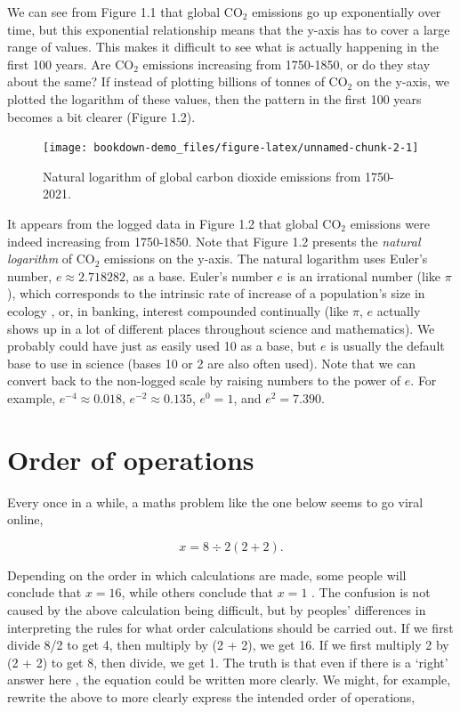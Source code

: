 \documentclass[
  openany]{krantz}
\begin{document}
We can see from Figure 1.1 that global CO\(_{2}\) emissions go up exponentially over time, but this exponential relationship means that the y-axis has to cover a large range of values.
This makes it difficult to see what is actually happening in the first 100 years.
Are CO\(_{2}\) emissions increasing from 1750-1850, or do they stay about the same?
If instead of plotting billions of tonnes of CO\(_{2}\) on the y-axis, we plotted the logarithm of these values, then the pattern in the first 100 years becomes a bit clearer (Figure 1.2).

\begin{figure}
\texttt{[image: bookdown-demo\_files/figure-latex/unnamed-chunk-2-1]} \caption{Natural logarithm of global carbon dioxide emissions from 1750-2021.}\label{fig:unnamed-chunk-2}
\end{figure}

It appears from the logged data in Figure 1.2 that global CO\(_{2}\) emissions were indeed increasing from 1750-1850.
Note that Figure 1.2 presents the \emph{natural logarithm} of CO\(_{2}\) emissions on the y-axis.
The natural logarithm uses Euler's number, \(e \approx 2.718282\), as a base.
Euler's number \(e\) is an irrational number (like \(\pi\)), which corresponds to the intrinsic rate of increase of a population's size in ecology \citep{Gotelli2001}, or, in banking, interest compounded continually (like \(\pi\), \(e\) actually shows up in a lot of different places throughout science and mathematics).
We probably could have just as easily used 10 as a base, but \(e\) is usually the default base to use in science (bases 10 or 2 are also often used).
Note that we can convert back to the non-logged scale by raising numbers to the power of \(e\).
For example, \(e^{-4} \approx 0.018\), \(e^{-2} \approx 0.135\), \(e^{0} = 1\), and \(e^{2} = 7.390\).

\hypertarget{order-of-operations}{%
\section{Order of operations}\label{order-of-operations}}

Every once in a while, a maths problem like the one below seems to go viral online,

\[x = 8 \div 2\left(2+2\right).\]

Depending on the order in which calculations are made, some people will conclude that \(x = 16\), while others conclude that \(x = 1\) \citep{Chernoff2022}.
The confusion is not caused by the above calculation being difficult, but by peoples' differences in interpreting the rules for what order calculations should be carried out.
If we first divide 8/2 to get 4, then multiply by (2 + 2), we get 16.
If we first multiply 2 by (2 + 2) to get 8, then divide, we get 1.
The truth is that even if there is a `right' answer here \citep{Chernoff2022}, the equation could be written more clearly.
We might, for example, rewrite the above to more clearly express the intended order of operations,
\end{document}
